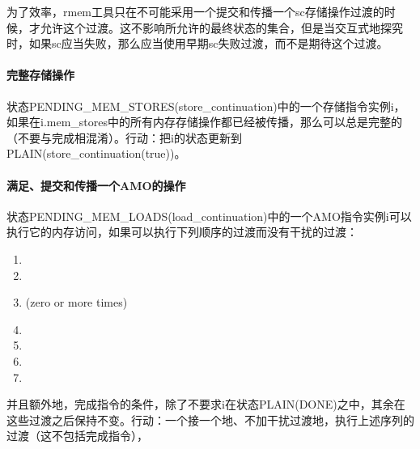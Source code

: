 \begin{commentary}
  为了效率，rmem工具只在不可能采用一个提交和传播一个sc存储操作过渡的时候，才允许这个过渡。这不影响所允许的最终状态的集合，但是当交互式地探究时，如果sc应当失败，那么应当使用早期sc失败过渡，而不是期待这个过渡。
\end{commentary}

\paragraph{完整存储操作}\label{omm:complete_stores}
状态PENDING_MEM_STORES(store_continuation)中的一个存储指令实例i，如果在i.mem_stores中的所有内存存储操作都已经被传播，那么可以总是完整的（不要与完成相混淆）。行动：把i的状态更新到PLAIN(store_continuation(true))。


\paragraph{满足、提交和传播一个AMO的操作}\label{omm:do_amo}
状态PENDING_MEM_LOADS(load_continuation)中的一个AMO指令实例i可以执行它的内存访问，如果可以执行下列顺序的过渡而没有干扰的过渡：
\begin{enumerate}
\item {}
\item {}
\item {} (zero or more times)
\item {}
\item {}
\item {}
\item {}
\end{enumerate}
并且额外地，完成指令的条件，除了不要求i在状态PLAIN(DONE)之中，其余在这些过渡之后保持不变。行动：一个接一个地、不加干扰过渡地，执行上述序列的过渡（这不包括完成指令），

